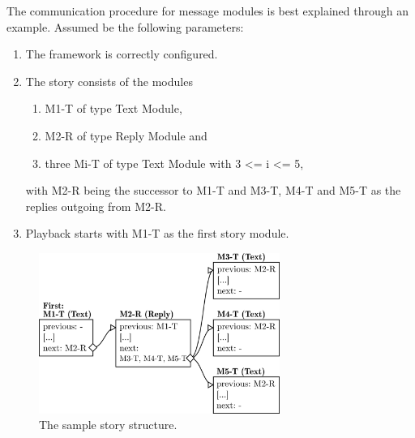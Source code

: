 The communication procedure for message modules is best explained through an example. Assumed be the following parameters: 
\begin{enumerate}
\item The framework is correctly configured. 
\item The story consists of the modules 
	\begin{enumerate}
	\item M1-T of type Text Module, 
	\item M2-R of type Reply Module and 
	\item three Mi-T of type Text Module with 3 <= i <= 5, 
	\end{enumerate}
with M2-R being the successor to M1-T and M3-T, M4-T and M5-T as the replies outgoing from M2-R. 
\item Playback starts with M1-T as the first story module.
\end{enumerate}

\begin{figure}[h]
\centering
\includegraphics[width=0.7\textwidth]{figures/sampleStory.png}
\caption[Sample story structure]{The sample story structure.}\label{fig:smpstory}
\end{figure}

